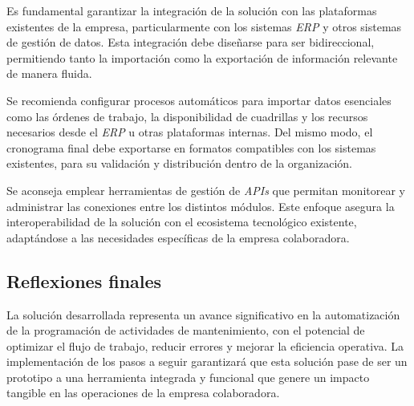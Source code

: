 \documentclass{article}
\begin{document}
Es fundamental garantizar la integración de la solución con las plataformas existentes de la empresa, particularmente con los sistemas \textit{ERP} y otros sistemas de gestión de datos. Esta integración debe diseñarse para ser bidireccional, permitiendo tanto la importación como la exportación de información relevante de manera fluida.

Se recomienda configurar procesos automáticos para importar datos esenciales como las órdenes de trabajo, la disponibilidad de cuadrillas y los recursos necesarios desde el \textit{ERP} u otras plataformas internas. Del mismo modo, el cronograma final debe exportarse en formatos compatibles con los sistemas existentes, para su validación y distribución dentro de la organización.

Se aconseja emplear herramientas de gestión de \textit{APIs} que permitan monitorear y administrar las conexiones entre los distintos módulos. Este enfoque asegura la interoperabilidad de la solución con el ecosistema tecnológico existente, adaptándose a las necesidades específicas de la empresa colaboradora.


\subsection{Reflexiones finales}  

La solución desarrollada representa un avance significativo en la automatización de la programación de actividades de mantenimiento, con el potencial de optimizar el flujo de trabajo, reducir errores y mejorar la eficiencia operativa. La implementación de los pasos a seguir garantizará que esta solución pase de ser un prototipo a una herramienta integrada y funcional que genere un impacto tangible en las operaciones de la empresa colaboradora.


\newpage
\end{document}
